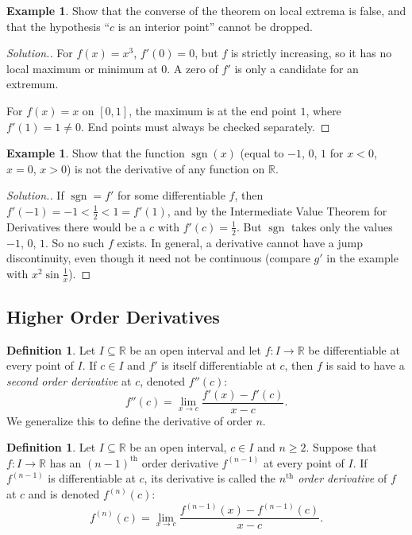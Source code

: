 \documentclass[11pt,a4paper]{article}
\numberwithin{equation}{section}
\theoremstyle{definition}
\newtheorem{defn}[thm]{Definition}
\newtheorem{exa}[thm]{Example}
\newenvironment{solution}
  {\renewcommand{\qedsymbol}{}\begin{proof}[\textit{Solution}.]}
  {\end{proof}}
\begin{document}
\begin{exa}
Show that the converse of the theorem on local extrema is false, and that the hypothesis ``$c$ is an interior point'' cannot be dropped.
\end{exa}

\begin{solution}
For $f(x) = x^3$, $f'(0) = 0$, but $f$ is strictly increasing, so it has no local maximum or minimum at $0$. A zero of $f'$ is only a candidate for an extremum.

For $f(x) = x$ on $[0,1]$, the maximum is at the end point $1$, where $f'(1) = 1\neq 0$. End points must always be checked separately.
\end{solution}

\begin{exa}
Show that the function $\operatorname{sgn}(x)$ (equal to $-1$, $0$, $1$ for $x<0$, $x=0$, $x>0$) is not the derivative of any function on $\mathbb{R}$.
\end{exa}

\begin{solution}
If $\operatorname{sgn} = f'$ for some differentiable $f$, then $f'(-1) = -1 < \frac{1}{2} < 1 = f'(1)$, and by the Intermediate Value Theorem for Derivatives there would be a $c$ with $f'(c) = \frac{1}{2}$. But $\operatorname{sgn}$ takes only the values $-1$, $0$, $1$. So no such $f$ exists. In general, a derivative cannot have a jump discontinuity, even though it need not be continuous (compare $g'$ in the example with $x^2\sin\frac{1}{x}$).
\end{solution}


\subsection{Higher Order Derivatives}

\begin{defn}
Let $I\subseteq \mathbb{R}$ be an open interval and let $f: I \longrightarrow \mathbb{R}$ be differentiable at every point of $I$. If $c\in I$ and $f'$ is itself differentiable at $c$, then $f$ is said to have a \emph{second order derivative} at $c$, denoted $f''(c)$:
$$f''(c) = \lim_{x\rightarrow c} \frac{f'(x) - f'(c)}{x - c}.$$
We generalize this to define the derivative of order $n$.
\end{defn}


\begin{defn}
Let $I\subseteq \mathbb{R}$ be an open interval, $c\in I$ and $n\geq 2$. Suppose that $f: I\longrightarrow \mathbb{R}$ has an $(n - 1)^{\text{th}}$ order derivative $f^{(n-1)}$ at every point of $I$. If $f^{(n-1)}$ is differentiable at $c$, its derivative is called the \emph{$n^{\text{th}}$ order derivative} of $f$ at $c$ and is denoted $f^{(n)}(c)$:
$$f^{(n)}(c) = \lim_{x\rightarrow c} \frac{f^{(n - 1)}(x) - f^{(n-1)}(c)}{x - c}.$$
\end{defn}
\end{document}
